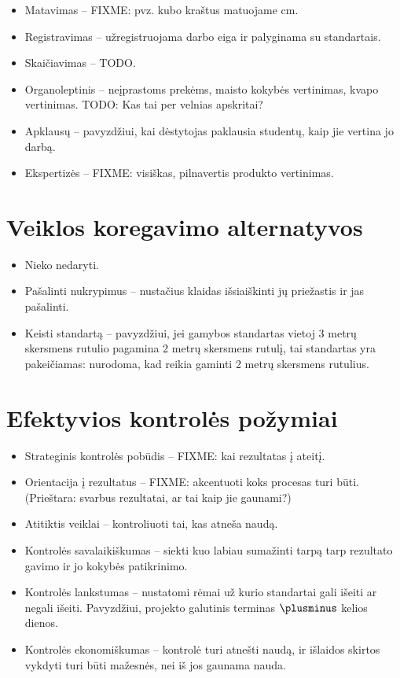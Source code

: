 \begin{itemize}
  \item Matavimas – FIXME: pvz. kubo kraštus matuojame cm.
  \item Registravimas – užregistruojama darbo eiga ir palyginama su
    standartais.
  \item Skaičiavimas – TODO.
  \item Organoleptinis – neįprastoms prekėms, maisto kokybės vertinimas,
    kvapo vertinimas. TODO: Kas tai per velnias apskritai?
  \item Apklausų – pavyzdžiui, kai dėstytojas paklausia studentų, kaip
    jie vertina jo darbą.
  \item Ekspertizės – FIXME: visiškas, pilnavertis produkto vertinimas.
\end{itemize}

\section{Veiklos koregavimo alternatyvos}

\begin{itemize}
  \item Nieko nedaryti.
  \item Pašalinti nukrypimus – nustačius klaidas išsiaiškinti jų priežastis
    ir jas pašalinti.
  \item Keisti standartą – pavyzdžiui, jei gamybos standartas vietoj
    3 metrų skersmens rutulio pagamina 2 metrų skersmens rutulį, tai
    standartas yra pakeičiamas: nurodoma, kad reikia gaminti 2 metrų
    skersmens rutulius.
\end{itemize}

\section{Efektyvios kontrolės požymiai}

\begin{itemize}
  \item Strateginis kontrolės pobūdis – FIXME: kai rezultatas į ateitį.
  \item Orientacija į rezultatus – FIXME: akcentuoti koks procesas turi
    būti. (Prieštara: svarbus rezultatai, ar tai kaip jie gaunami?)
  \item Atitiktis veiklai – kontroliuoti tai, kas atneša naudą.
  \item Kontrolės savalaikiškumas – siekti kuo labiau sumažinti tarpą
    tarp rezultato gavimo ir jo kokybės patikrinimo.
  \item Kontrolės lankstumas – nustatomi rėmai už kurio standartai
    gali išeiti ar negali išeiti. Pavyzdžiui, projekto galutinis terminas
    $\plusminus$ kelios dienos.
  \item Kontrolės ekonomiškumas – kontrolė turi atnešti naudą, ir išlaidos
    skirtos vykdyti turi būti mažesnės, nei iš jos gaunama nauda.
\end{itemize}
